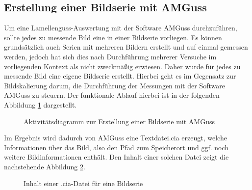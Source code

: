 \documentclass[
fontsize=10pt, 
listof = totoc,
parskip = half	
]{report}
\begin{document}
\subsection{Erstellung einer Bildserie mit AMGuss}
\label{subsec:FlowErstellungBildserieAMGuss}

Um eine Lamellenguss-Auswertung mit der Software AMGuss durchzuführen, sollte jedes zu messende Bild eine in einer Bildserie vorliegen. Es können grundsätzlich auch Serien mit mehreren Bildern erstellt und auf einmal gemessen werden, jedoch hat sich dies nach Durchführung mehrerer Versuche im vorliegenden Kontext als nicht zweckmäßig erwiesen. Daher wurde für jedes zu messende Bild eine eigene Bildserie erstellt. Hierbei geht es im Gegensatz zur Bildskalierung darum, die Durchführung der Messungen mit der Software AMGuss zu steuern. Der funktionale Ablauf hierbei ist in der folgenden Abbildung \ref{fig:FlowBildserieErstellen} dargestellt.


\begin{figure}[H]
	\centering
	\caption{Aktivitätsdiagramm zur Erstellung einer Bildserie mit AMGuss}
	\label{fig:FlowBildserieErstellen}
\end{figure}

\noindent Im Ergebnis wird dadurch von AMGuss eine Textdatei.cia erzeugt, welche Informationen über das Bild, also den Pfad zum Speicherort und ggf. noch weitere Bildinformationen enthält. Den Inhalt einer solchen Datei zeigt die nachstehende Abbildung \ref{fig:CiaContent}.

\begin{figure}[H]
	\centering
	\caption{Inhalt einer .cia-Datei für eine Bildserie}
	\label{fig:CiaContent}
\end{figure}
\end{document}
